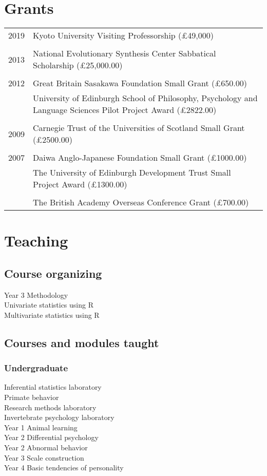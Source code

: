 \documentclass[11pt]{article}
\begin{document}
\section*{Grants}
\begin{tabular}{p{3cm}p{12cm}}
2019 & Kyoto University Visiting Professorship (£49,000) \\ \\
2013 & National Evolutionary Synthesis Center Sabbatical Scholarship
(£25,000.00) \\ \\
2012 & Great Britain Sasakawa Foundation Small Grant (£650.00) \\
& University of Edinburgh School of Philosophy, Psychology and
Language Sciences Pilot Project Award (£2822.00) \\ \\
2009 & Carnegie Trust of the Universities of Scotland Small Grant
(£2500.00) \\ \\
2007 & Daiwa Anglo-Japanese Foundation Small Grant (£1000.00) \\ 
& The University of Edinburgh Development Trust Small Project Award
(£1300.00) \\ \\
& The British Academy Overseas Conference Grant (£700.00)
\end{tabular}

\section*{Teaching}
\subsection*{Course organizing}
Year 3 Methodology \\
Univariate statistics using R \\
Multivariate statistics using R

\subsection*{Courses and modules taught}
\subsubsection*{Undergraduate}
Inferential statistics laboratory \\
Primate behavior \\
Research methods laboratory \\
Invertebrate psychology laboratory \\
Year 1 Animal learning \\
Year 2 Differential psychology \\
Year 2 Abnormal behavior \\
Year 3 Scale construction \\
Year 4 Basic tendencies of personality
\end{document}
